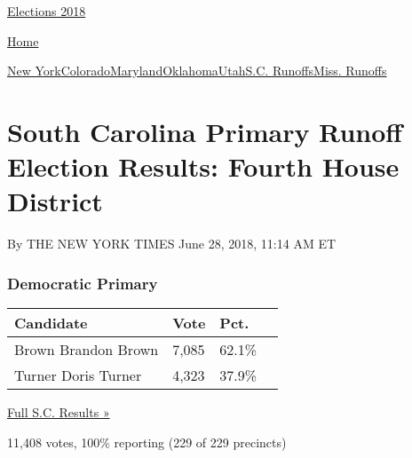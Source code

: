 \href{//www.nytimes3xbfgragh.onion}{}\href{https://www.nytimes3xbfgragh.onion/interactive/2018/us/elections/calendar-primary-results.html}{
Elections 2018}

\href{//www.nytimes3xbfgragh.onion}{ Home}

\href{https://www.nytimes3xbfgragh.onion/interactive/2018/06/26/us/elections/results-new-york-primary-elections.html}{New
York}\href{https://www.nytimes3xbfgragh.onion/interactive/2018/06/26/us/elections/results-colorado-primary-elections.html}{Colorado}\href{https://www.nytimes3xbfgragh.onion/interactive/2018/06/26/us/elections/results-maryland-primary-elections.html}{Maryland}\href{https://www.nytimes3xbfgragh.onion/interactive/2018/06/26/us/elections/results-oklahoma-primary-elections.html}{Oklahoma}\href{https://www.nytimes3xbfgragh.onion/interactive/2018/06/26/us/elections/results-utah-primary-elections-ul.html}{Utah}\href{https://www.nytimes3xbfgragh.onion/interactive/2018/06/26/us/elections/results-south-carolina-primary-runoff-elections.html}{S.C.
Runoffs}\href{https://www.nytimes3xbfgragh.onion/interactive/2018/06/26/us/elections/results-mississippi-primary-runoff-elections.html}{Miss.
Runoffs}

\hypertarget{south-carolina-primary-runoff-election-results-fourth-house-district}{%
\section{South Carolina Primary Runoff Election Results: Fourth House
District}\label{south-carolina-primary-runoff-election-results-fourth-house-district}}

By THE NEW YORK TIMES June 28, 2018, 11:14 AM ET

\hypertarget{democratic-primary}{%
\subsubsection{Democratic Primary}\label{democratic-primary}}

\begin{longtable}[]{@{}llll@{}}
\toprule
Candidate & Vote & Pct. &\tabularnewline
\midrule
\endhead
 Brown Brandon Brown & 7,085 & 62.1\% &\tabularnewline
 Turner Doris Turner & 4,323 & 37.9\% &\tabularnewline
\bottomrule
\end{longtable}

\href{https://www.nytimes3xbfgragh.onion/elections/results/south-carolina}{Full
S.C. Results »}

11,408 votes, 100\% reporting (229 of 229 precincts)

